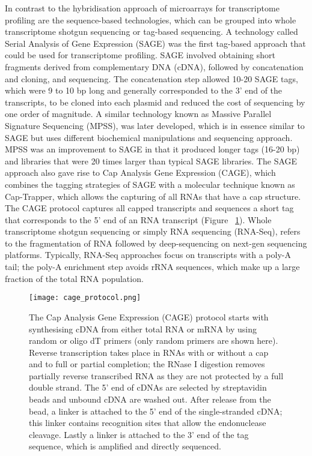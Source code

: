 In contrast to the hybridisation approach of microarrays for transcriptome profiling are the sequence-based technologies, which can be grouped into whole transcriptome shotgun sequencing or tag-based sequencing. A technology called Serial Analysis of Gene Expression (SAGE)\cite{pmid7570003} was the first tag-based approach that could be used for transcriptome profiling. SAGE involved obtaining short fragments derived from complementary DNA (cDNA), followed by concatenation and cloning, and sequencing. The concatenation step allowed 10-20 SAGE tags, which were 9 to 10 bp long and generally corresponded to the 3' end of the transcripts, to be cloned into each plasmid and reduced the cost of sequencing by one order of magnitude. A similar technology known as Massive Parallel Signature Sequencing (MPSS), was later developed, which is in essence similar to SAGE but uses different biochemical manipulations and sequencing approach\cite{pmid10835600}. MPSS was an improvement to SAGE in that it produced longer tags (16-20 bp) and libraries that were 20 times larger than typical SAGE libraries\cite{pmid10835600}. The SAGE approach also gave rise to Cap Analysis Gene Expression (CAGE)\cite{pmid14663149}, which combines the tagging strategies of SAGE with a molecular technique known as Cap-Trapper\cite{pmid8938445,pmid9179497}, which allows the capturing of all RNAs that have a cap structure. The CAGE protocol captures all capped transcripts and sequences a short tag that corresponds to the 5' end of an RNA transcript (Figure ~\ref{fig:cage_protocol}). Whole transcriptome shotgun sequencing or simply RNA sequencing (RNA-Seq), refers to the fragmentation of RNA followed by deep-sequencing on next-gen sequencing platforms\cite{pmid19015660}. Typically, RNA-Seq approaches focus on transcripts with a poly-A tail; the poly-A enrichment step avoids rRNA sequences, which make up a large fraction of the total RNA population.

\begin{figure}[!ht]
   \centering
   \texttt{[image: cage\_protocol.png]}
   \caption[Cap Analysis Gene Expression protocol]{The Cap Analysis Gene Expression (CAGE) protocol starts with synthesising cDNA from either total RNA or mRNA by using random or oligo dT primers (only random primers are shown here). Reverse transcription takes place in RNAs with or without a cap and to full or partial completion; the RNase I digestion removes partially reverse transcribed RNA as they are not protected by a full double strand. The 5' end of cDNAs are selected by streptavidin beads and unbound cDNA are washed out. After release from the bead, a linker is attached to the 5' end of the single-stranded cDNA; this linker contains recognition sites that allow the endonuclease cleavage. Lastly a linker is attached to the 3' end of the tag sequence, which is amplified and directly sequenced.}
   \label{fig:cage_protocol}
\end{figure}

